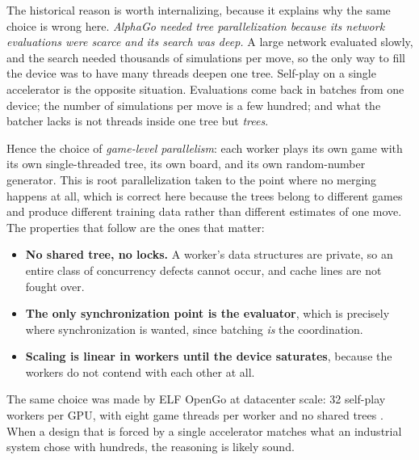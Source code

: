 The historical reason is worth internalizing, because it explains why the same
choice is wrong here. \emph{AlphaGo needed tree parallelization because its
network evaluations were scarce and its search was deep.} A large network
evaluated slowly, and the search needed thousands of simulations per move, so the
only way to fill the device was to have many threads deepen one tree.
Self-play on a single accelerator is the opposite situation. Evaluations come
back in batches from one device; the number of simulations per move is a few
hundred; and what the batcher lacks is not threads inside one tree but
\emph{trees}.

Hence the choice of \emph{game-level parallelism}: each worker plays its own game
with its own single-threaded tree, its own board, and its own random-number
generator. This is root parallelization taken to the point where no merging
happens at all, which is correct here because the trees belong to different games
and produce different training data rather than different estimates of one move.
The properties that follow are the ones that matter:

\begin{itemize}
  \item \textbf{No shared tree, no locks.} A worker's data structures are private,
        so an entire class of concurrency defects cannot occur, and cache lines
        are not fought over.
  \item \textbf{The only synchronization point is the evaluator}, which is
        precisely where synchronization is wanted, since batching \emph{is} the
        coordination.
  \item \textbf{Scaling is linear in workers until the device saturates}, because
        the workers do not contend with each other at all.
\end{itemize}

The same choice was made by ELF OpenGo at datacenter scale: 32 self-play workers
per GPU, with eight game threads per worker and no shared trees
\citep{tian2019elf}. When a design that is forced by a single accelerator matches
what an industrial system chose with hundreds, the reasoning is likely sound.

